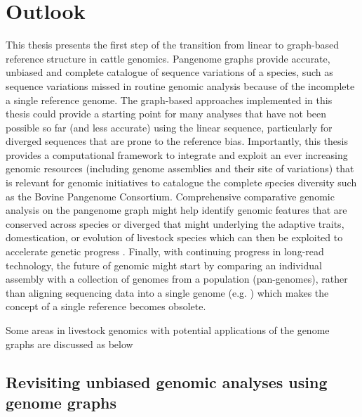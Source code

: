 \documentclass[../main.tex]{subfiles}
\begin{document}
\newpage 

\section*{\LARGE{Outlook}}
\thispagestyle{plain}
This thesis presents the first step of the transition from linear to graph-based reference structure in cattle genomics. Pangenome graphs provide accurate, unbiased and complete catalogue of sequence variations of a species, such as sequence variations missed in routine genomic analysis because of the incomplete a single reference genome. The graph-based approaches implemented in this thesis could provide a starting point for many analyses that have not been possible so far (and less accurate) using the linear sequence, particularly for diverged sequences that are prone to the reference bias. Importantly, this thesis provides a computational framework to integrate and exploit an ever increasing genomic resources (including genome assemblies and their site of variations) that is relevant for genomic initiatives to catalogue the complete species diversity such as the Bovine Pangenome Consortium. Comprehensive comparative genomic analysis on the pangenome graph might help identify genomic features that are conserved across species or diverged that might underlying the adaptive traits, domestication, or evolution of livestock species which can then be exploited to accelerate genetic progress \citep{foissac2019multi,clark2020faang}. Finally, with continuing progress in long-read technology, the future of genomic might start by comparing an individual assembly with a collection of genomes from  a population (pan-genomes), rather than aligning sequencing data into a single genome (e.g. \citep{ebert2021haplotype}) which makes the concept of a single reference becomes obsolete.

Some areas in livestock genomics with potential applications of the genome graphs are discussed as below


\subsection*{Revisiting unbiased genomic analyses using genome graphs}
\end{document}
